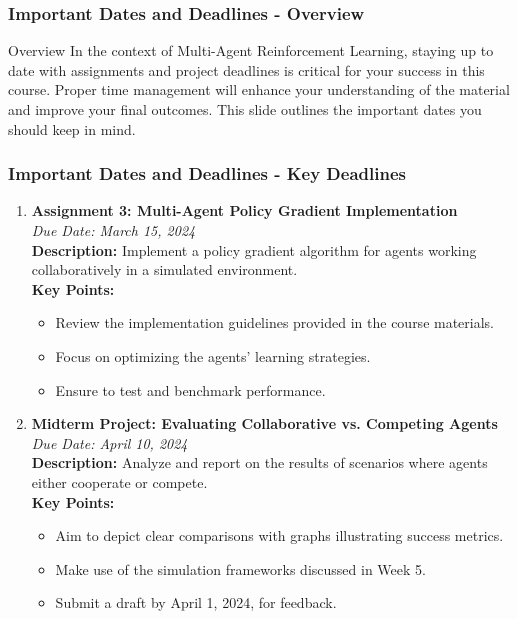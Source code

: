 \documentclass[aspectratio=169]{beamer}
\begin{document}
\begin{frame}[fragile]
    \frametitle{Important Dates and Deadlines - Overview}
    \begin{block}{Overview}
        In the context of Multi-Agent Reinforcement Learning, staying up to date with assignments and project deadlines is critical for your success in this course. Proper time management will enhance your understanding of the material and improve your final outcomes. 
        This slide outlines the important dates you should keep in mind.
    \end{block}
\end{frame}

\begin{frame}[fragile]
    \frametitle{Important Dates and Deadlines - Key Deadlines}
    \begin{enumerate}
        \item \textbf{Assignment 3: Multi-Agent Policy Gradient Implementation}\\
        \textit{Due Date: March 15, 2024}\\
        \textbf{Description:} Implement a policy gradient algorithm for agents working collaboratively in a simulated environment.\\
        \textbf{Key Points:}
        \begin{itemize}
            \item Review the implementation guidelines provided in the course materials.
            \item Focus on optimizing the agents’ learning strategies.
            \item Ensure to test and benchmark performance.
        \end{itemize}

        \item \textbf{Midterm Project: Evaluating Collaborative vs. Competing Agents}\\
        \textit{Due Date: April 10, 2024}\\
        \textbf{Description:} Analyze and report on the results of scenarios where agents either cooperate or compete.\\
        \textbf{Key Points:}
        \begin{itemize}
            \item Aim to depict clear comparisons with graphs illustrating success metrics.
            \item Make use of the simulation frameworks discussed in Week 5.
            \item Submit a draft by April 1, 2024, for feedback.
        \end{itemize}


\end{enumerate}
\end{frame}
\end{document}
